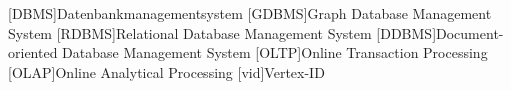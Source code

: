 
\begin{acronym}[Abkürzungsverzeichnis]
	[DBMS]{Datenbankmanagementsystem}
	[GDBMS]{Graph Database Management System}
	[RDBMS]{Relational Database Management System}
	[DDBMS]{Document-oriented Database Management System}
	[OLTP]{Online Transaction Processing}
	[OLAP]{Online Analytical Processing}
	[vid]{Vertex-ID}
\end{acronym}